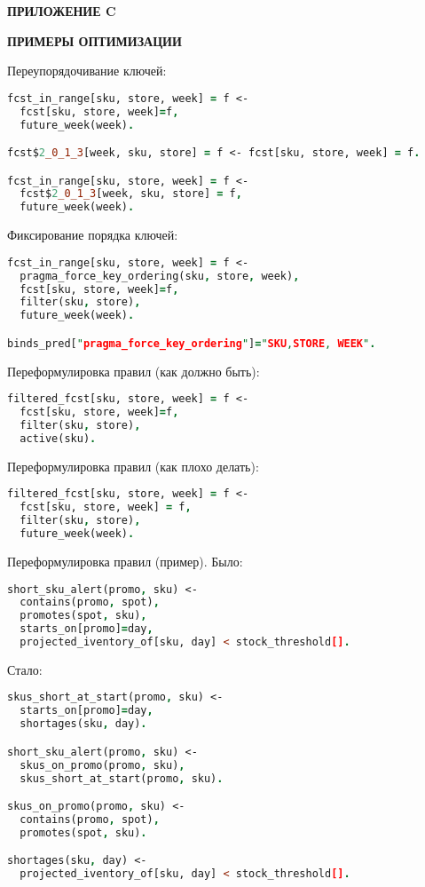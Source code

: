 \newpage
\begin{flushright}
\textbf{\MakeUppercase{Приложение C}}
\end{flushright}
\begin{center}
\textbf{\MakeUppercase{Примеры оптимизации}}
\end{center}

Переупорядочивание ключей:

\begin{lstlisting}[language=Prolog]
fcst_in_range[sku, store, week] = f <-
  fcst[sku, store, week]=f,
  future_week(week).

fcst$2_0_1_3[week, sku, store] = f <- fcst[sku, store, week] = f.

fcst_in_range[sku, store, week] = f <-
  fcst$2_0_1_3[week, sku, store] = f,
  future_week(week).
\end{lstlisting}

Фиксирование порядка ключей:

\begin{lstlisting}[language=Prolog]
fcst_in_range[sku, store, week] = f <-
  pragma_force_key_ordering(sku, store, week),
  fcst[sku, store, week]=f,
  filter(sku, store),
  future_week(week).

binds_pred["pragma_force_key_ordering"]="SKU,STORE, WEEK".
\end{lstlisting}

Переформулировка правил (как должно быть):

\begin{lstlisting}[language=Prolog]
filtered_fcst[sku, store, week] = f <-
  fcst[sku, store, week]=f,
  filter(sku, store),
  active(sku).
\end{lstlisting}

Переформулировка правил (как плохо делать):

\begin{lstlisting}[language=Prolog]
filtered_fcst[sku, store, week] = f <-
  fcst[sku, store, week] = f,
  filter(sku, store),
  future_week(week).
\end{lstlisting}

Переформулировка правил (пример). Было:

\begin{lstlisting}[language=Prolog]
short_sku_alert(promo, sku) <-
  contains(promo, spot),
  promotes(spot, sku),
  starts_on[promo]=day,
  projected_iventory_of[sku, day] < stock_threshold[].
\end{lstlisting}

Стало:

\begin{lstlisting}[language=Prolog]
skus_short_at_start(promo, sku) <-
  starts_on[promo]=day,
  shortages(sku, day).

short_sku_alert(promo, sku) <-
  skus_on_promo(promo, sku),
  skus_short_at_start(promo, sku).

skus_on_promo(promo, sku) <-
  contains(promo, spot),
  promotes(spot, sku).

shortages(sku, day) <-
  projected_iventory_of[sku, day] < stock_threshold[].
\end{lstlisting}
